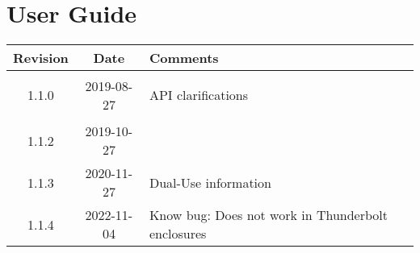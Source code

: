 \section{User Guide}
\begin{tabularx}{\textwidth}{|c|c|X|}
    \hline
    Revision & Date & Comments\\
    \hline\hline
    \hypertarget{ugrev}{1.1.0} & 2019-08-27 & API clarifications\\
	\hline
    1.1.2 & 2019-10-27 &  \\
    \hline
    1.1.3 & 2020-11-27 & Dual-Use information\\
    \hline 
    1.1.4 & 2022-11-04 & Know bug: Does not work in Thunderbolt enclosures\\
    \hline
\end{tabularx}
